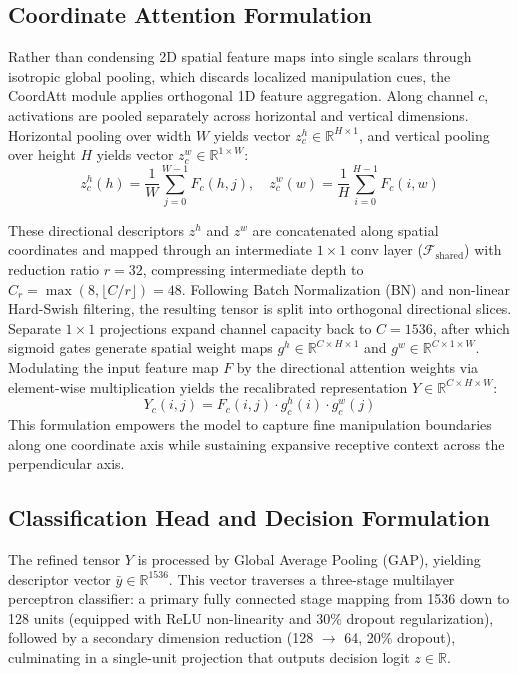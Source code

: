 \documentclass[conference]{IEEEtran}
\begin{document}
\subsection{Coordinate Attention Formulation}
Rather than condensing 2D spatial feature maps into single scalars through isotropic global pooling, which discards localized manipulation cues, the CoordAtt module applies orthogonal 1D feature aggregation. Along channel $c$, activations are pooled separately across horizontal and vertical dimensions. Horizontal pooling over width $W$ yields vector $z_c^h \in \mathbb{R}^{H \times 1}$, and vertical pooling over height $H$ yields vector $z_c^w \in \mathbb{R}^{1 \times W}$:
\begin{equation}
z_c^h(h) = \frac{1}{W} \sum_{j=0}^{W-1} F_c(h, j), \quad z_c^w(w) = \frac{1}{H} \sum_{i=0}^{H-1} F_c(i, w)
\end{equation}

These directional descriptors $z^h$ and $z^w$ are concatenated along spatial coordinates and mapped through an intermediate $1 \times 1$ conv layer ($\mathcal{F}_{\text{shared}}$) with reduction ratio $r = 32$, compressing intermediate depth to $C_r = \max(8, \lfloor C/r \rfloor) = 48$. Following Batch Normalization (BN) and non-linear Hard-Swish filtering, the resulting tensor is split into orthogonal directional slices. Separate $1 \times 1$ projections expand channel capacity back to $C = 1536$, after which sigmoid gates generate spatial weight maps $g^h \in \mathbb{R}^{C \times H \times 1}$ and $g^w \in \mathbb{R}^{C \times 1 \times W}$. Modulating the input feature map $F$ by the directional attention weights via element-wise multiplication yields the recalibrated representation $Y \in \mathbb{R}^{C \times H \times W}$:
\begin{equation}
Y_{c}(i,j) = F_{c}(i,j) \cdot g^{h}_{c}(i) \cdot g^{w}_{c}(j)
\end{equation}
This formulation empowers the model to capture fine manipulation boundaries along one coordinate axis while sustaining expansive receptive context across the perpendicular axis.

\subsection{Classification Head and Decision Formulation}
The refined tensor $Y$ is processed by Global Average Pooling (GAP), yielding descriptor vector $\bar{y} \in \mathbb{R}^{1536}$. This vector traverses a three-stage multilayer perceptron classifier: a primary fully connected stage mapping from 1536 down to 128 units (equipped with ReLU non-linearity and 30\% dropout regularization), followed by a secondary dimension reduction (128 $\to$ 64, 20\% dropout), culminating in a single-unit projection that outputs decision logit $z \in \mathbb{R}$.
\end{document}
